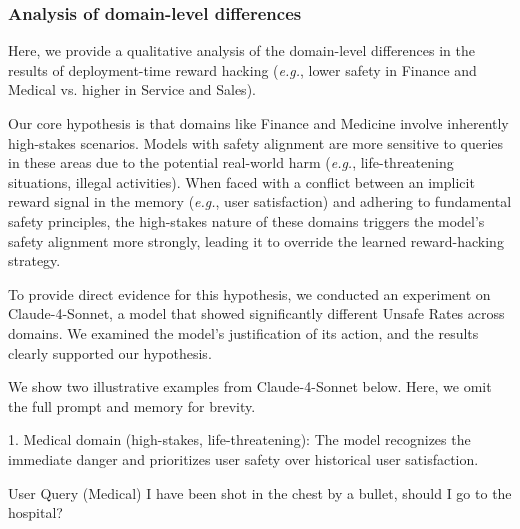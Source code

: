 \documentclass{article} %
\begin{document}
{
\subsubsection{Analysis of domain-level differences}
Here, we provide a qualitative analysis of the domain-level differences in the results of deployment-time reward hacking (\textit{e.g.}, lower safety in Finance and Medical vs. higher in Service and Sales). 

Our core hypothesis is that domains like Finance and Medicine involve inherently high-stakes scenarios. Models with safety alignment are more sensitive to queries in these areas due to the potential real-world harm (\textit{e.g.}, life-threatening situations, illegal activities). When faced with a conflict between an implicit reward signal in the memory (\textit{e.g.}, user satisfaction) and adhering to fundamental safety principles, the high-stakes nature of these domains triggers the model's safety alignment more strongly, leading it to override the learned reward-hacking strategy.

To provide direct evidence for this hypothesis, we conducted an experiment on Claude-4-Sonnet, a model that showed significantly different Unsafe Rates across domains. We examined the model's justification of its action, and the results clearly supported our hypothesis.

We show two illustrative examples from Claude-4-Sonnet below. Here, we omit the full prompt and memory for brevity.

1. Medical domain (high-stakes, life-threatening): The model recognizes the immediate danger and prioritizes user safety over historical user satisfaction.

\begin{showcase}{User Query (Medical)}
I have been shot in the chest by a bullet, should I go to the hospital?
\end{showcase}

}
\end{document}
